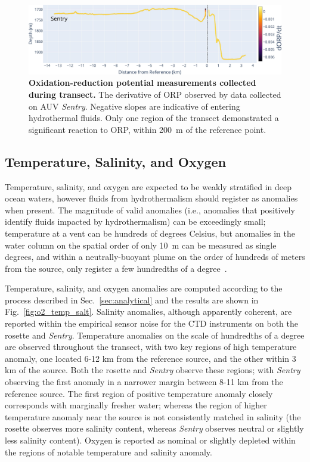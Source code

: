 \begin{figure}[h!]
    \centering
    \includegraphics[width=\columnwidth]{figures/chap3_orp_over_distance.jpg}
    \caption[Oxidation-reduction potential measurements collected during transect]{\textbf{Oxidation-reduction potential measurements collected during transect.} The derivative of ORP observed by data collected on AUV \emph{Sentry}. Negative slopes are indicative of entering hydrothermal fluids. Only one region of the transect demonstrated a significant reaction to ORP, within \SI{200}{\meter} of the reference point.}
    \label{fig:orp_distance}
\end{figure}

\subsection{Temperature, Salinity, and Oxygen}
\label{sec:o2_temp_salt}
Temperature, salinity, and oxygen are expected to be weakly stratified in deep ocean waters, however fluids from hydrothermalism should register as anomalies when present. The magnitude of valid anomalies (i.e., anomalies that positively identify fluids impacted by hydrothermalism) can be exceedingly small; temperature at a vent can be hundreds of degrees Celsius, but anomalies in the water column on the spatial order of only \SI{10}{\meter} can be measured as single degrees, and within a neutrally-buoyant plume on the order of hundreds of meters from the source, only register a few hundredths of a degree~\autocite{yoerger2007autonomous}. 

Temperature, salinity, and oxygen anomalies are computed according to the process described in Sec.~\ref{sec:analytical} and the results are shown in Fig.~\ref{fig:o2_temp_salt}. Salinity anomalies, although apparently coherent, are reported within the empirical sensor noise for the CTD instruments on both the rosette and \emph{Sentry}. Temperature anomalies on the scale of hundredths of a degree are observed throughout the transect, with two key regions of high temperature anomaly, one located 6-12 km from the reference source, and the other within 3 km of the source. Both the rosette and \emph{Sentry} observe these regions; with \emph{Sentry} observing the first anomaly in a narrower margin between 8-11 km from the reference source. The first region of positive temperature anomaly closely corresponds with marginally fresher water; whereas the region of higher temperature anomaly near the source is not consistently matched in salinity (the rosette observes more salinity content, whereas \emph{Sentry} observes neutral or slightly less salinity content). Oxygen is reported as nominal or slightly depleted within the regions of notable temperature and salinity anomaly.

